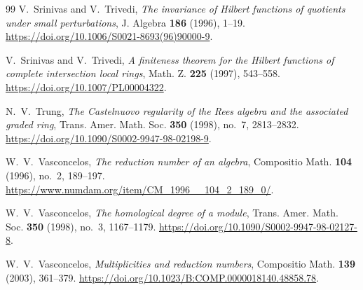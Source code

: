 \documentclass[11pt,reqno]{amsart}
\numberwithin{equation}{section}
\theoremstyle{definition}
\begin{document}
\begin{thebibliography}{99}
V.~Srinivas and V.~Trivedi, \emph{The invariance of Hilbert functions of quotients under small perturbations}, J. Algebra \textbf{186} (1996), 1--19. \url{https://doi.org/10.1006/S0021-8693(96)90000-9}.

V.~Srinivas and V.~Trivedi, \emph{A finiteness theorem for the Hilbert functions of complete intersection local rings}, Math. Z. \textbf{225} (1997), 543--558. \url{https://doi.org/10.1007/PL00004322}.


N.~V.~Trung, \emph{The Castelnuovo regularity of the Rees algebra and the associated graded ring}, Trans. Amer. Math. Soc. \textbf{350} (1998), no.~7, 2813--2832. \url{https://doi.org/10.1090/S0002-9947-98-02198-9}.

W.~V.~Vasconcelos, \emph{The reduction number of an algebra}, Compositio Math. \textbf{104} (1996), no.~2, 189--197. \url{https://www.numdam.org/item/CM_1996__104_2_189_0/}.

W.~V.~Vasconcelos, \emph{The homological degree of a module}, Trans. Amer. Math. Soc. \textbf{350} (1998), no.~3, 1167--1179. \url{https://doi.org/10.1090/S0002-9947-98-02127-8}.

W.~V.~Vasconcelos, \emph{Multiplicities and reduction numbers}, Compositio Math. \textbf{139} (2003), 361--379. \url{https://doi.org/10.1023/B:COMP.0000018140.48858.78}.

\end{thebibliography}
\end{document}
